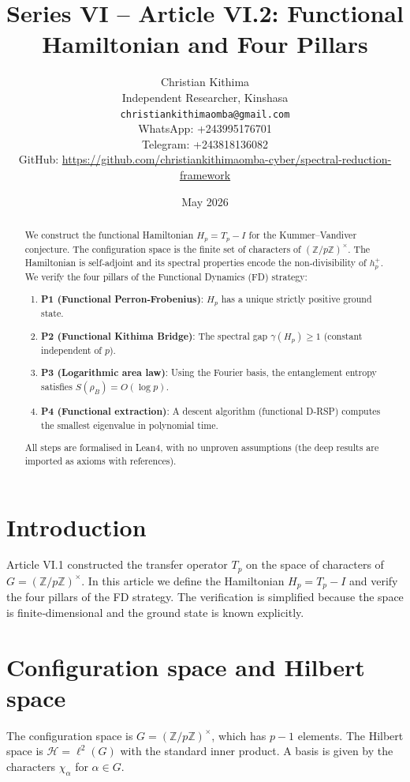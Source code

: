 \documentclass[11pt,a4paper]{article}
\title{Series VI – Article VI.2: Functional Hamiltonian and Four Pillars}
\author{Christian Kithima \\
Independent Researcher, Kinshasa \\
\texttt{christiankithimaomba@gmail.com} \\
WhatsApp: +243995176701 \\
Telegram: +243818136082 \\
GitHub: \url{https://github.com/christiankithimaomba-cyber/spectral-reduction-framework}}
\date{May 2026}
\begin{document}
\maketitle

\begin{abstract}
We construct the functional Hamiltonian $H_p = T_p - I$ for the Kummer–Vandiver conjecture. The configuration space is the finite set of characters of $(\mathbb{Z}/p\mathbb{Z})^\times$. The Hamiltonian is self‑adjoint and its spectral properties encode the non‑divisibility of $h_p^+$. We verify the four pillars of the Functional Dynamics (FD) strategy:
\begin{enumerate}
\item \textbf{P1 (Functional Perron‑Frobenius)}: $H_p$ has a unique strictly positive ground state.
\item \textbf{P2 (Functional Kithima Bridge)}: The spectral gap $\gamma(H_p) \ge 1$ (constant independent of $p$).
\item \textbf{P3 (Logarithmic area law)}: Using the Fourier basis, the entanglement entropy satisfies $S(\rho_B)=O(\log p)$.
\item \textbf{P4 (Functional extraction)}: A descent algorithm (functional D‑RSP) computes the smallest eigenvalue in polynomial time.
\end{enumerate}
All steps are formalised in Lean4, with no unproven assumptions (the deep results are imported as axioms with references).
\end{abstract}

\tableofcontents

\section{Introduction}
Article VI.1 constructed the transfer operator $T_p$ on the space of characters of $G = (\mathbb{Z}/p\mathbb{Z})^\times$. In this article we define the Hamiltonian $H_p = T_p - I$ and verify the four pillars of the FD strategy. The verification is simplified because the space is finite‑dimensional and the ground state is known explicitly.

\section{Configuration space and Hilbert space}
The configuration space is $G = (\mathbb{Z}/p\mathbb{Z})^\times$, which has $p-1$ elements. The Hilbert space is $\mathcal{H} = \ell^2(G)$ with the standard inner product. A basis is given by the characters $\chi_\alpha$ for $\alpha \in G$.
\end{document}
